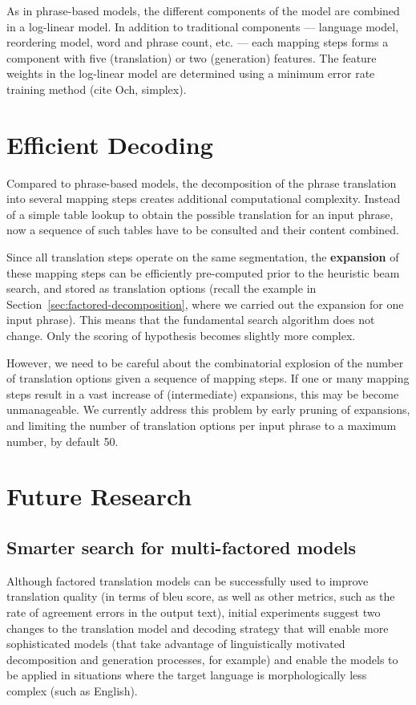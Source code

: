 \documentclass[11pt]{report}
\theoremstyle{plain}
\begin{document}
As in phrase-based models, the different components of the model are combined in a log-linear model. In addition to traditional components --- language model, reordering model, word and phrase count, etc. --- each mapping steps forms a component with five (translation) or two (generation) features. The feature weights in the log-linear model are determined using a minimum error rate training method (cite Och, simplex).

\section{Efficient Decoding}
Compared to phrase-based models, the decomposition of the phrase translation into several mapping steps creates additional computational complexity. Instead of a simple table lookup to obtain the possible translation for an input phrase, now a sequence of such tables have to be consulted and their content combined.

Since all translation steps operate on the same segmentation, the {\bf expansion} of these mapping steps can be efficiently pre-computed prior to the heuristic beam search, and stored as translation options (recall the example in Section~\ref{sec:factored-decomposition}, where we carried out the expansion for one input phrase). This means that the fundamental search algorithm does not change. Only the scoring of hypothesis becomes slightly more complex.

However, we need to be careful about the combinatorial explosion of the number of translation options given a sequence of mapping steps. If one or many mapping steps result in a vast increase of (intermediate) expansions, this may be become unmanageable. We currently address this problem by early pruning of expansions, and limiting the number of translation options per input phrase to a maximum number, by default 50.

\section{Future Research}
\subsection{Smarter search for multi-factored models}
Although factored translation models can be successfully used to
improve translation quality (in terms of {\sc bleu} score, as well
as other metrics, such as the rate of agreement errors in the output
text), initial experiments suggest two changes to the translation
model and decoding strategy that will enable more sophisticated
models (that take advantage of linguistically motivated
decomposition and generation processes, for example) and enable the
models to be applied in situations where the target language is
morphologically less complex (such as English).
\end{document}
